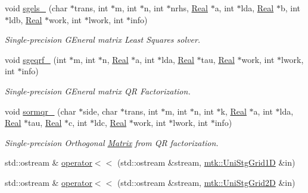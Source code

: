 \begin{DoxyCompactItemize}
\item 
void \hyperlink{namespacemtk_ada6df1b733204aa7ff0b1ec7556288f9}{sgels\-\_\-} (char $\ast$trans, int $\ast$m, int $\ast$n, int $\ast$nrhs, \hyperlink{group__c01-roots_gac080bbbf5cbb5502c9f00405f894857d}{Real} $\ast$a, int $\ast$lda, \hyperlink{group__c01-roots_gac080bbbf5cbb5502c9f00405f894857d}{Real} $\ast$b, int $\ast$ldb, \hyperlink{group__c01-roots_gac080bbbf5cbb5502c9f00405f894857d}{Real} $\ast$work, int $\ast$lwork, int $\ast$info)
\begin{DoxyCompactList}\small\item\em Single-\/precision G\-Eneral matrix Least Squares solver. \end{DoxyCompactList}\item 
void \hyperlink{namespacemtk_aece7419193d8ab43e186c97ad6d529fb}{sgeqrf\-\_\-} (int $\ast$m, int $\ast$n, \hyperlink{group__c01-roots_gac080bbbf5cbb5502c9f00405f894857d}{Real} $\ast$a, int $\ast$lda, \hyperlink{group__c01-roots_gac080bbbf5cbb5502c9f00405f894857d}{Real} $\ast$tau, \hyperlink{group__c01-roots_gac080bbbf5cbb5502c9f00405f894857d}{Real} $\ast$work, int $\ast$lwork, int $\ast$info)
\begin{DoxyCompactList}\small\item\em Single-\/precision G\-Eneral matrix Q\-R Factorization. \end{DoxyCompactList}\item 
void \hyperlink{namespacemtk_a59c58408e1c0a9837b67a417be986b82}{sormqr\-\_\-} (char $\ast$side, char $\ast$trans, int $\ast$m, int $\ast$n, int $\ast$k, \hyperlink{group__c01-roots_gac080bbbf5cbb5502c9f00405f894857d}{Real} $\ast$a, int $\ast$lda, \hyperlink{group__c01-roots_gac080bbbf5cbb5502c9f00405f894857d}{Real} $\ast$tau, \hyperlink{group__c01-roots_gac080bbbf5cbb5502c9f00405f894857d}{Real} $\ast$c, int $\ast$ldc, \hyperlink{group__c01-roots_gac080bbbf5cbb5502c9f00405f894857d}{Real} $\ast$work, int $\ast$lwork, int $\ast$info)
\begin{DoxyCompactList}\small\item\em Single-\/precision Orthogonal \hyperlink{classmtk_1_1Matrix}{Matrix} from Q\-R factorization. \end{DoxyCompactList}\item 
std\-::ostream \& \hyperlink{namespacemtk_a97f79d150b3b5c7b76d4fcc2271f972b}{operator$<$$<$} (std\-::ostream \&stream, \hyperlink{classmtk_1_1UniStgGrid1D}{mtk\-::\-Uni\-Stg\-Grid1\-D} \&in)
\item 
std\-::ostream \& \hyperlink{namespacemtk_a82cd99c0c7e695e4eccfbe7380525959}{operator$<$$<$} (std\-::ostream \&stream, \hyperlink{classmtk_1_1UniStgGrid2D}{mtk\-::\-Uni\-Stg\-Grid2\-D} \&in)
\end{DoxyCompactItemize}
